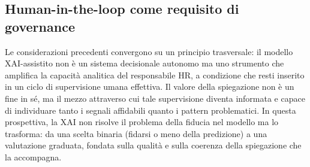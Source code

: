 \subsection{Human-in-the-loop come requisito di governance}

Le considerazioni precedenti convergono su un principio trasversale: il modello XAI-assistito non è un sistema decisionale autonomo ma uno strumento che amplifica la capacità analitica del responsabile HR, a condizione che resti inserito in un ciclo di supervisione umana effettiva. Il valore della spiegazione non è un fine in sé, ma il mezzo attraverso cui tale supervisione diventa informata e capace di individuare tanto i segnali affidabili quanto i pattern problematici. In questa prospettiva, la XAI non risolve il problema della fiducia nel modello ma lo trasforma: da una scelta binaria (fidarsi o meno della predizione) a una valutazione graduata, fondata sulla qualità e sulla coerenza della spiegazione che la accompagna.
